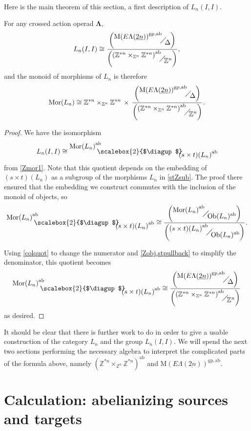 \documentclass{amsbook} %
\newcommand{\ML}{\mathbf{\Lambda}}
\newcommand{\MorLn}{\mathrm{Mor}(L_n)}
\newcommand{\quotient}[2]{ \raisebox{0.5\height}{$#1$} \mkern-5mu\diagup\mkern-4mu \raisebox{-0.5\height}{$#2$} }
\newcommand{\bigquotient}[2]{ \raisebox{0.75\height}{$#1$} \mkern-12mu\scalebox{2}{$\diagup$}\mkern-10mu \raisebox{-0.5\height}{$#2$} }
\newcommand{\ELnn}{E\Lambda(\underline{2n})}
\newcommand{\ab}{\mathrm{ab}}
\newcommand{\gp}{\mathrm{gp}}
\numberwithin{section}{chapter}
\begin{document}
Here is the main theorem of this section, a first description of $L_n(I,I)$.

\begin{thm}
For any crossed action operad $\ML$, 
  \[
    L_n(I,I) \cong \frac{\left(\quotient{{\mathrm{M}(\ELnn)}^{\gp,\ab}}{\Delta}\right)}{\left(\quotient{{(\mathbb{Z}^{\ast n} \times_{\mathbb{Z}^n} \mathbb{Z}^{\ast n})}^{\ab}}{\mathbb{Z}^n}\right)}, 
  \]
and the monoid of morphisms of $L_n$ is therefore
  \[ 
    \MorLn \cong \mathbb{Z}^{\ast n} \times_{\mathbb{Z}^n} \mathbb{Z}^{\ast n}  \, \times \, \frac{\left(\quotient{{\mathrm{M}(\ELnn)}^{\gp,\ab}}{\Delta}\right)}{\left(\quotient{{(\mathbb{Z}^{\ast n} \times_{\mathbb{Z}^n} \mathbb{Z}^{\ast n})}^{\ab}}{\mathbb{Z}^n}\right)}.
  \]
\end{thm}
\begin{proof}
We have the isomorphism
  \[
    L_n(I,I) \cong \bigquotient{{\MorLn}^{\ab}}{{(s \times t)(L_n)}^{\ab}}
  \]
from \cref{Zmor1}. Note that this quotient  depends on the embedding of $(s \times t)(L_n)$ as a subgroup of the morphisms $L_n$ in \cref{stZsub}. The proof there ensured that the embedding we construct commutes with the inclusion of the monoid of objects, so
  \[
    \bigquotient{{\MorLn}^{\ab}}{{(s \times t)(L_n)}^{\ab}} \cong \frac{\left(\quotient{{\MorLn}^{\ab}}{\mathrm{Ob}(L_n)^{\ab}}\right)}{\left(\quotient{{(s \times t)(L_n)}^{\ab}}{\mathrm{Ob}(L_n)^{\ab}}\right)}.
  \]


Using \cref{colquot} to change the numerator and \cref{Zobj,stpullback} to simplify the denominator, this quotient becomes
  \[
    \bigquotient{{\MorLn}^{\ab}}{{(s \times t)(L_n)}^{\ab}} \cong \frac{\left(\quotient{{\mathrm{M}(\ELnn)}^{\gp,\ab}}{\Delta}\right)}{\left(\quotient{{(\mathbb{Z}^{\ast n} \times_{\mathbb{Z}^n} \mathbb{Z}^{\ast n})}^{\ab}}{\mathbb{Z}^n}\right)}
  \]
as desired.
\end{proof}

It should be clear that there is further work to do in order to give a usable construction of the category $L_n$ and the group $L_n(I,I)$. We will spend the next two sections performing the necessary algebra to interpret the complicated parts of the formula above, namely $(\mathbb{Z}^{\ast n} \times_{\mathbb{Z}^n} \mathbb{Z}^{\ast n})^{\ab}$ and ${\mathrm{M}(\ELnn)}^{\gp,\ab}$.

\section{Calculation: abelianizing sources and targets}
 
\end{document}
